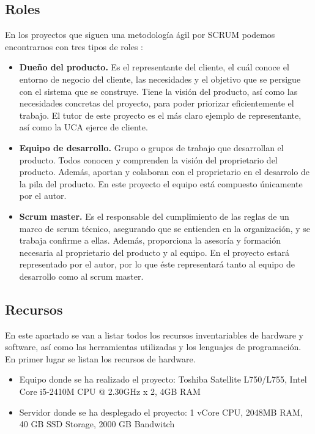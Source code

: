 \subsection{Roles}
En los proyectos que siguen una metodología ágil por SCRUM podemos encontrarnos con tres tipos de roles \cite{scrum2016}:

\begin{itemize}
	\item \textbf{Dueño del producto.} Es el representante del cliente, el cuál conoce el entorno de negocio del cliente, las necesidades y el objetivo que se persigue con el sistema que se construye. Tiene la visión del producto, así como las necesidades concretas del proyecto, para poder priorizar eficientemente el trabajo. El tutor de este proyecto es el más claro ejemplo de representante, así como la UCA ejerce de cliente.
	\item \textbf{Equipo de desarrollo.} Grupo o grupos de trabajo que desarrollan el producto. Todos conocen y comprenden la visión del proprietario del producto. Además, aportan y colaboran con el proprietario en el desarrolo de la pila del producto. En este proyecto el equipo está compuesto únicamente por el autor.
	\item \textbf{Scrum master.} Es el responsable del cumplimiento de las reglas de un marco de scrum técnico, asegurando que se entienden en la organización, y se trabaja confirme a ellas. Además, proporciona la asesoría y formación necesaria al proprietario del producto y al equipo. En el proyecto estará representado por el autor, por lo que éste representará tanto al equipo de desarrollo como al scrum master.
\end{itemize}

\subsection{Recursos}
En este apartado se van a listar todos los recursos inventariables de hardware y software, así como las herramientas utilizadas y los lenguajes de programación.\\

En primer lugar se listan los recursos de hardware.\\

\begin{itemize}
	\item Equipo donde se ha realizado el proyecto: Toshiba Satellite L750/L755, Intel  \textregistered Core \texttrademark  i5-2410M CPU @ 2.30GHz x 2, 4GB RAM
	\item Servidor donde se ha desplegado el proyecto: 1 vCore CPU, 2048MB RAM, 40 GB SSD Storage, 2000 GB Bandwitch
\end{itemize}

